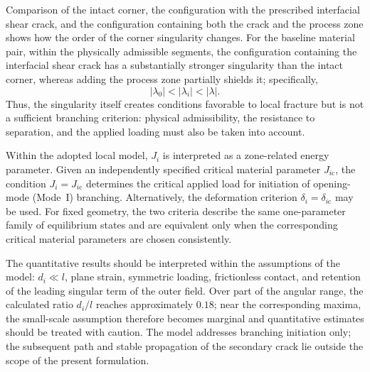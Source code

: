 Comparison of the intact corner, the configuration with the prescribed
interfacial shear crack, and the configuration containing both the crack and
the process zone shows how the order of the corner singularity changes. For the baseline material pair, within the physically admissible segments,
the configuration containing the interfacial shear crack has a substantially
stronger singularity than the intact corner, whereas adding the process zone
partially shields it; specifically,
\begin{equation*}
  |\lambda_0|<|\lambda_i|<|\lambda|.
\end{equation*}
Thus, the singularity itself creates conditions favorable to local fracture
but is not a sufficient branching criterion: physical admissibility, the
resistance to separation, and the applied loading must also be taken into
account.

Within the adopted local model, $J_i$ is interpreted as a zone-related
energy parameter. Given an independently specified critical material
parameter $J_{i\mathrm{c}}$, the condition $J_i=J_{i\mathrm{c}}$ determines
the critical applied load for initiation of opening-mode (Mode~I) branching.
Alternatively, the deformation criterion
$\delta_i=\delta_{i\mathrm{c}}$ may be used. For fixed geometry, the two
criteria describe the same one-parameter family of equilibrium states and are
equivalent only when the corresponding critical material parameters are
chosen consistently.

The quantitative results should be interpreted within the assumptions of the
model: $d_i\ll l$, plane strain, symmetric loading, frictionless contact, and
retention of the leading singular term of the outer field. Over part of the
angular range, the calculated ratio $d_i/l$ reaches approximately $0.18$;
near the corresponding maxima, the small-scale assumption therefore becomes
marginal and quantitative estimates should be treated with caution. The model addresses branching initiation only; the subsequent path and stable
propagation of the secondary crack lie outside the scope of the present
formulation.
